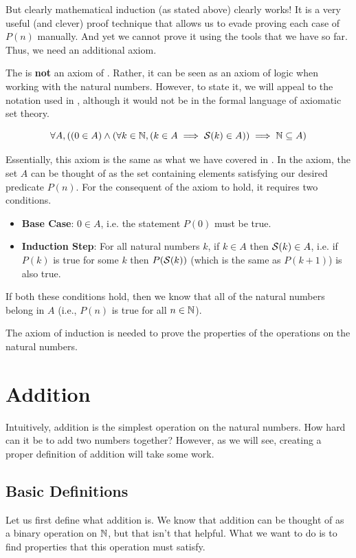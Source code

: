 But clearly mathematical induction (as stated above) clearly works! It is a very useful (and clever) proof technique that allows us to evade proving each case of $P(n)$ manually. And yet we cannot prove it using the tools that we have so far. Thus, we need an additional axiom.

The  is \textbf{not} an axiom of \ZFC. Rather, it can be seen as an axiom of logic when working with the natural numbers. However, to state it, we will appeal to the notation used in \ZFC, although it would not be in the formal language of axiomatic set theory.

\begin{axiom}[Induction]\label{axiom:induction}
    \vspace{-10px}
    \[
        \forall A, \left((0 \in A) \land (\forall k \in \mathbb{N}, (k \in A \implies {\mathcal{S}(k)} \in A)) \implies \mathbb{N} \subseteq A\right)
    \]
\end{axiom}

Essentially, this axiom is the same as what we have covered in . In the axiom, the set $A$ can be thought of as the set containing elements satisfying our desired predicate $P(n)$. For the consequent of the axiom to hold, it requires two conditions.
\begin{itemize}
    \item \textbf{Base Case}: $0 \in A$, i.e. the statement $P(0)$ must be true.
    \item \textbf{Induction Step}: For all natural numbers $k$, if $k \in A$ then ${\mathcal{S}(k)} \in A$, i.e. if $P(k)$ is true for some $k$ then $P({\mathcal{S}(k)})$ (which is the same as $P(k+1)$) is also true.
\end{itemize}
If both these conditions hold, then we know that all of the natural numbers belong in $A$ (i.e., $P(n)$ is true for all $n \in \mathbb{N}$).

The axiom of induction is needed to prove the properties of the operations on the natural numbers.

\section{Addition}
Intuitively, addition is the simplest operation on the natural numbers. How hard can it be to add two numbers together? However, as we will see, creating a proper definition of addition will take some work.

\subsection{Basic Definitions}
Let us first define what addition is. We know that addition can be thought of as a binary operation on $\mathbb{N}$, but that isn't that helpful. What we want to do is to find properties that this operation must satisfy.

